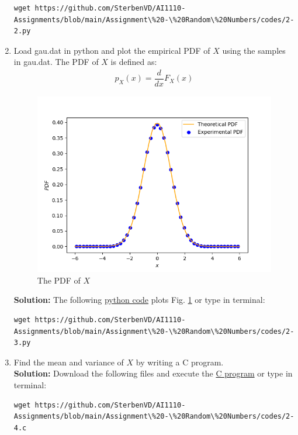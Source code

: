 \documentclass[journal,12pt,onecolumn]{IEEEtran}
\numberwithin{equation}{section}
\renewcommand\thesection{\arabic{section}}
\providecommand{\gitlink}[2]{{\color{blue}\href{https://github.com/SterbenVD/AI1110-Assignments/blob/main/Assignment\%20-\%20Random\%20Numbers/#1}{#2}}}
\newcommand{\solution}{\noindent \textbf{Solution: }}
\begin{document}
\begin{enumerate}[label=\thesection.\arabic*,ref=\thesection.\theenumi]
          \begin{lstlisting}
wget https://github.com/SterbenVD/AI1110-Assignments/blob/main/Assignment\%20-\%20Random\%20Numbers/codes/2-2.py
            \end{lstlisting}
    \item Load gau.dat in python and plot the empirical PDF of $X$ using the samples in gau.dat.
          The PDF of $X$ is defined as:
          \begin{align}
              p_{X}(x) = \dfrac{d}{dx}F_{X}(x)
          \end{align}
          \begin{figure}[H]
              \centering
              \includegraphics[scale = 0.7]{../figs/2_pdf}
              \caption{The PDF of $X$}
              \label{fig:2_pdf}
          \end{figure}
          \solution The following \gitlink{codes/2-3.py}{python code} plots Fig. \ref{fig:2_pdf} or type in terminal:
          \begin{lstlisting}
wget https://github.com/SterbenVD/AI1110-Assignments/blob/main/Assignment\%20-\%20Random\%20Numbers/codes/2-3.py
            \end{lstlisting}
    \item Find the mean and variance of $X$ by writing a C program.
          \\
          \solution Download the following files and execute the \gitlink{codes/2-4.c}{C program} or type in terminal:
          \begin{lstlisting}
wget https://github.com/SterbenVD/AI1110-Assignments/blob/main/Assignment\%20-\%20Random\%20Numbers/codes/2-4.c

\end{lstlisting}
\end{enumerate}
\end{document}
